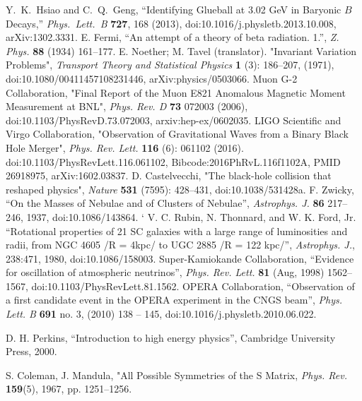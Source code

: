 \begin{thebibliography}{9}
 Y.~K.~Hsiao and C.~Q.~Geng, ``Identifying Glueball at 3.02 GeV in Baryonic $B$ Decays,''
  {\it Phys.\ Lett.\ B} {\bf 727}, 168 (2013),
  doi:10.1016/j.physletb.2013.10.008,
  arXiv:1302.3331.
  E. Fermi, ``An attempt of a theory of beta radiation. 1.'', {\it Z. Phys.} \textbf{88} (1934) 161–177.
E. Noether; M. Tavel (translator).
"Invariant Variation Problems", {\it Transport Theory and Statistical Physics} {\bf 1} (3): 186–207, (1971), doi:10.1080/00411457108231446, arXiv:physics/0503066.
 Muon G-2 Collaboration, "Final Report of the Muon E821 Anomalous Magnetic Moment Measurement at BNL", {\it Phys. Rev. D} {\bf 73} 072003 (2006),  doi:10.1103/PhysRevD.73.072003, arxiv:hep-ex/0602035.
LIGO Scientific and Virgo Collaboration, 
"Observation of Gravitational Waves from a Binary Black Hole Merger", {\it Phys. Rev. Lett.} {\bf 116} (6): 061102 (2016).
doi:10.1103/PhysRevLett.116.061102,
Bibcode:2016PhRvL.116f1102A, PMID 26918975, arXiv:1602.03837. 
 D. Castelvecchi, "The black-hole collision that reshaped physics", {\it Nature} {\bf 531} (7595): 428–431, doi:10.1038/531428a.
F. Zwicky, ``On the Masses of Nebulae and of Clusters of Nebulae'', {\it Astrophys. J.} {\bf 86} 217– 246, 1937, doi:10.1086/143864.
 `%
  V. C. Rubin, N. Thonnard, and W. K. Ford, Jr. 
  ``Rotational properties of 21 SC galaxies with a large range of luminosities and radii, from NGC 4605 /R = 4kpc/ to UGC 2885 /R = 122 kpc/'', {\it Astrophys. J.}, 238:471, 1980, doi:10.1086/158003.
  Super-Kamiokande Collaboration, “Evidence for oscillation of atmospheric neutrinos”, 
  {\it Phys. Rev. Lett.} {\bf 81} (Aug, 1998) 1562–1567, doi:10.1103/PhysRevLett.81.1562.
   OPERA Collaboration,
    “Observation of a first candidate event in the OPERA experiment in the CNGS beam”, 
    {\it Phys. Lett. B} {\bf 691} no. 3, (2010) 138 – 145, doi:10.1016/j.physletb.2010.06.022.
    
   D. H. Perkins, ``Introduction to high energy physics'', Cambridge University Press, 2000.
   
   S. Coleman, J. Mandula, "All Possible Symmetries of the S Matrix, {\it Phys. Rev.} \textbf{159}(5), 1967, pp. 1251–1256.
   

\end{thebibliography}
